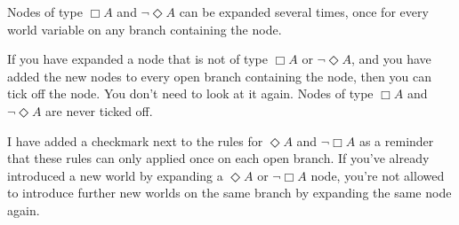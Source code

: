 Nodes of type $\Box A$ and $\neg \Diamond A$ can be expanded several times, once
for every world variable on any branch containing the node.

If you have expanded a node that is not of type $\Box A$ or $\neg \Diamond A$,
and you have added the new nodes to every open branch containing the node, then
you can tick off the node. You don't need to look at it again. Nodes of type
$\Box A$ and $\neg \Diamond A$ are never ticked off.

I have added a checkmark next to the rules for $\Diamond A$ and $\neg \Box A$ as
a reminder that these rules can only applied once on each open branch. If you've
already introduced a new world by expanding a $\Diamond A$ or $\neg \Box A$
node, you're not allowed to introduce further new worlds on the same branch by
expanding the same node again.

